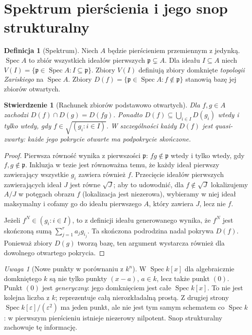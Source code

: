 \documentclass[11pt,a4paper,openany]{report}
\numberwithin{equation}{section}
\theoremstyle{plain}
\newtheorem{stwierdzenie}[twierdzenie]{Stwierdzenie}
\theoremstyle{definition}
\newtheorem{definicja}[twierdzenie]{Definicja}
\theoremstyle{remark}
\newtheorem{uwaga}[twierdzenie]{Uwaga}
\newcommand{\Spec}{\operatorname{Spec}}
\begin{document}
\section{Spektrum pierścienia i jego snop strukturalny}
\label{sec:spek-snop}

\begin{definicja}[Spektrum]
Niech $A$ będzie pierścieniem przemiennym z jedynką.
$\Spec A$ to zbiór wszystkich ideałów pierwszych
$\mathfrak p\subsetneq A$. Dla ideału $I\subseteq A$
niech $V(I)=\{\mathfrak p\in\Spec A:I\subseteq\mathfrak p\}$.
Zbiory $V(I)$ definiują zbiory domknięte
\emph{topologii Zariskiego} na $\Spec A$.
Zbiory $D(f)=\{\mathfrak p\in\Spec A:f\notin\mathfrak p\}$
stanowią bazę jej zbiorów otwartych.
\end{definicja}

\begin{stwierdzenie}[Rachunek zbiorów podstawowo otwartych]
Dla $f,g\in A$ zachodzi
$D(f)\cap D(g)=D(fg)$. Ponadto
$D(f)\subseteq\bigcup_{i\in I}D(g_i)$ wtedy
i tylko wtedy, gdy $f\in\sqrt{(g_i:i\in I)}$.
W szczególności każdy $D(f)$ jest quasi-zwarty:
każde jego pokrycie otwarte ma podpokrycie skończone.
\end{stwierdzenie}
\begin{proof}
Pierwsza równość wynika z pierwszości
$\mathfrak p$: $fg\notin\mathfrak p$ wtedy
i tylko wtedy, gdy $f,g\notin\mathfrak p$.
Inkluzja w tezie jest równoważna temu, że
każdy ideał pierwszy zawierający wszystkie $g_i$
zawiera również $f$. Przecięcie ideałów pierwszych
zawierających ideał $J$ jest równe $\sqrt J$;
aby to udowodnić, dla $f\notin\sqrt J$ lokalizujemy
$A/J$ w potęgach obrazu $f$ (lokalizacja jest
niezerowa), wybieramy w niej ideał maksymalny
i cofamy go do ideału pierwszego $A$,
który zawiera $J$, lecz nie $f$.

Jeżeli $f^N\in(g_i:i\in I)$, to z definicji
ideału generowanego wynika, że $f^N$ jest
skończoną sumą $\sum_{j=1}^r a_j g_{i_j}$.
Ta skończona podrodzina nadal pokrywa $D(f)$.
Ponieważ zbiory $D(g)$ tworzą bazę, ten argument
wystarcza również dla dowolnego otwartego pokrycia.
\end{proof}

\begin{uwaga}[Nowe punkty w porównaniu z $k^n$]
W $\Spec k[x]$ dla algebraicznie domkniętego $k$
są nie tylko punkty $(x-a)$, $a\in k$, lecz także
punkt $(0)$. Punkt $(0)$ jest \emph{generyczny}:
jego domknięciem jest całe $\Spec k[x]$.
To nie jest kolejna liczba z $k$; reprezentuje
całą nierozkładalną prostą. Z drugiej strony
$\Spec k[\varepsilon]/(\varepsilon^2)$ ma jeden
punkt, ale nie jest tym samym schematem co $\Spec k$:
w pierwszym pierścieniu istnieje niezerowy nilpotent.
Snop strukturalny zachowuje tę informację.
\end{uwaga}
\end{document}
